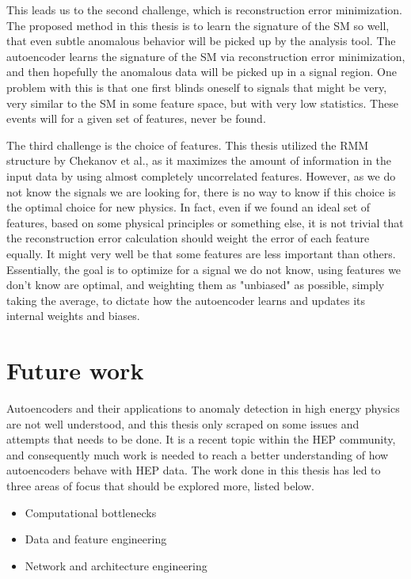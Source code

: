 This leads us to the second challenge, which is reconstruction error minimization. The proposed method in this thesis is to 
learn the signature of the SM so well, that even subtle anomalous behavior will be picked up by the analysis tool. 
The autoencoder learns the signature of the SM via reconstruction error minimization, and then hopefully the 
anomalous data will be picked up in a signal region. One problem with this is that one first blinds oneself to signals 
that might be very, very similar to the SM in some feature space, but with very low statistics. These events 
will for a given set of features, never be found. \par 

The third challenge is the choice of features. This thesis utilized the RMM structure by Chekanov et al., as it maximizes 
the amount of information in the input data by using almost completely uncorrelated features. However, as we do not know the signals 
we are looking for, there is no way to know if this choice is the optimal choice for new physics. In fact, even if we found 
an ideal set of features, based on some physical principles or something else, it is not trivial that the reconstruction error calculation
should weight the error of each feature equally. It might very well be that some features are less important than others. Essentially, 
the goal is to optimize for a signal we do not know, using features we don't know are optimal, and weighting them as "unbiased" as 
possible, simply taking the average, to dictate how the autoencoder learns and updates its internal weights and biases. 

\section{Future work}

Autoencoders and their applications to anomaly detection in high energy physics are not well understood, 
and this thesis only scraped on some issues and attempts that needs to be done. It is a recent topic within 
the HEP community, and consequently much work is needed to reach a better understanding of how autoencoders 
behave with HEP data. The work done in this thesis has led to three areas of focus that should be explored more, 
listed below. 

\begin{itemize}
    \item Computational bottlenecks 
    \item Data and feature engineering 
    \item Network and architecture engineering
\end{itemize}

